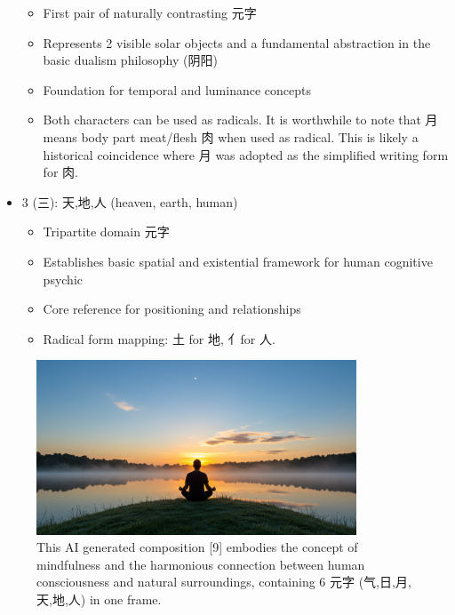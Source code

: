 \documentclass[11pt,letterpaper]{article}
\begin{document}
\begin{itemize}
  \begin{itemize}
  \tightlist
  \item
    First pair of naturally contrasting 元字
  \item
    Represents 2 visible solar objects and a fundamental abstraction in
    the basic dualism philosophy (阴阳)
  \item
    Foundation for temporal and luminance concepts
  \item
    Both characters can be used as radicals. It is worthwhile to note
    that 月 means body part meat/flesh 肉 when used as radical. This is
    likely a historical coincidence where 月 was adopted as the
    simplified writing form for 肉.
  \end{itemize}
\item
  3 (三): 天,地,人 (heaven, earth, human)

  \begin{itemize}
  \tightlist
  \item
    Tripartite domain 元字
  \item
    Establishes basic spatial and existential framework for human
    cognitive psychic
  \item
    Core reference for positioning and relationships
  \item
    Radical form mapping: 土 for 地, 亻for 人.
  \end{itemize}
\end{itemize}

\begin{figure}
\centering
\includegraphics[width=0.85\textwidth]{./images/sun-moon-heaven-human-earth-meditation-morning.jpg}
\caption{This AI generated composition {[}9{]} embodies the concept of
mindfulness and the harmonious connection between human consciousness
and natural surroundings, containing 6 元字 (气,日,月,天,地,人) in one
frame.}
\end{figure}
\end{document}
